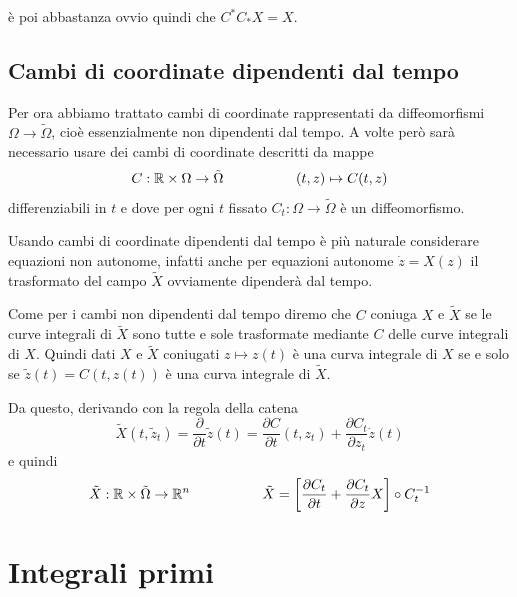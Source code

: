 \documentclass[11pt,a4paper,twoside]{book}
\theoremstyle{esss}
\theoremstyle{dotless}
\numberwithin{equation}{section} %
\begin{document}
è poi abbastanza ovvio quindi che $C^{*}C_{*}X=X$.



\subsection{Cambi di coordinate dipendenti dal tempo}\label{sezCambiCoordinateDipendentiTempo}
Per ora abbiamo trattato cambi di coordinate rappresentati da diffeomorfismi $\Omega\rightarrow\tilde{\Omega}$, cioè essenzialmente non dipendenti dal tempo. A volte però sarà necessario usare dei cambi di coordinate descritti da mappe
\[
C:\mathbb{R}\times\Omega\rightarrow\tilde{\Omega} \hspace{0.15\linewidth} (t,z)\mapsto C(t,z)
\]
differenziabili in $t$ e dove per ogni $t$ fissato $C_t:\Omega\rightarrow\tilde{\Omega}$ è un diffeomorfismo.

Usando cambi di coordinate dipendenti dal tempo è più naturale considerare equazioni non autonome, infatti anche per equazioni autonome $\dot{z}=X(z)$ il trasformato del campo $\tilde{X}$ ovviamente dipenderà dal tempo.

Come per i cambi non dipendenti dal tempo diremo che $C$ coniuga $X$ e $\tilde{X}$ se le curve integrali di $\tilde{X}$ sono tutte e sole trasformate mediante $C$ delle curve integrali di $X$.
Quindi dati $X$ e $\tilde{X}$ coniugati $ z\mapsto z(t)$ è una curva integrale di $X$ se e solo se $\tilde{z}(t)=C(t,z(t))$ è una curva integrale di $\tilde{X}$.

Da questo, derivando con la regola della catena
\[
\tilde{X}(t,\tilde{z}_t)=\dfrac{\partial}{\partial t} \tilde{z}(t) = \dfrac{\partial C}{\partial t}(t,z_t)+\dfrac{\partial C_t}{\partial z_t} \dot{z}(t)
\]
e quindi
\begin{equation}
\tilde{X}:\mathbb{R}\times\tilde{\Omega}\rightarrow\mathbb{R}^n \hspace{0.15\linewidth}
\tilde{X}=\left[\dfrac{\partial C_t}{\partial t} + \dfrac{\partial C_t}{\partial z}X
\right] \circ C_t^{-1}
\end{equation}

\section{Integrali primi}
\end{document}

